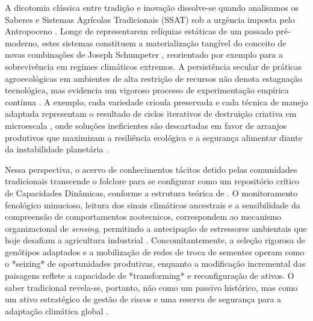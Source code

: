 A dicotomia clássica entre tradição e inovação dissolve-se quando analisamos os Saberes e Sistemas Agrícolas Tradicionais (SSAT) sob a urgência imposta pelo Antropoceno \cite{OterosRozas2019Spain}. Longe de representarem relíquias estáticas de um passado pré-moderno, estes sistemas constituem a materialização tangível do conceito de novas combinações de Joseph Schumpeter  \cite{Schumpeter1942}, reorientado por exemplo para a sobrevivência em regimes climáticos extremos. A persistência secular de práticas agroecológicas em ambientes de alta restrição de recursos não denota estagnação tecnológica, mas evidencia um vigoroso processo de experimentação empírica contínua \cite{Wezel2024Agro}. A exemplo, cada variedade crioula preservada e cada técnica de manejo adaptada representam o resultado de ciclos iterativos de destruição criativa em microescala  \cite{Gonzalez2014}, onde soluções ineficientes são descartadas em favor de arranjos produtivos que maximizam a resiliência ecológica e a segurança alimentar diante da instabilidade planetária  \cite{Rodríguez-Robayo202047}.

Nessa perspectiva, o acervo de conhecimentos tácitos detido pelas comunidades tradicionais transcende o folclore para se configurar como um repositório crítico de Capacidades Dinâmicas, conforme a estrutura teórica de . O monitoramento fenológico minucioso, leitura dos sinais climáticos ancestrais e a sensibilidade da compreensão de comportamentos zootecnicos, correspondem ao mecanismo organizacional de \textit{sensing}, permitindo a antecipação de estressores ambientais que hoje desafiam a agricultura industrial  \cite{Chao2025Pastoral}. Concomitantemente, a seleção rigorosa de genótipos adaptados e a mobilização de redes de troca de sementes operam como o *seizing* de oportunidades produtivas, enquanto a modificação incremental das paisagens reflete a capacidade de *transforming* e reconfiguração de ativos. O saber tradicional revela-se, portanto, não como um passivo histórico, mas como um ativo estratégico de gestão de riscos e uma reserva de segurança para a adaptação climática global \cite{Ghafouri2025,Tian-Liang2025,Díaz-Pérez2025}.

